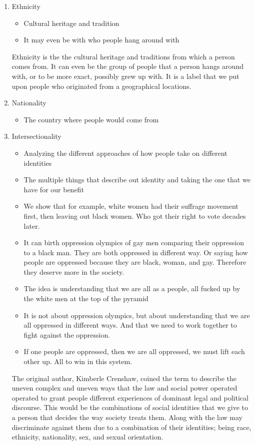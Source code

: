 \documentclass{article}
\begin{document}
\begin{enumerate}
  \item Ethnicity
    \begin{itemize}
      \item Cultural heritage and tradition
      \item It may even be with who people hang around with
    \end{itemize}
    Ethnicity is the the cultural heritage and traditions
    from which a person comes from.
    It can even be the group of people
    that a person hangs around with,
    or to be more exact, possibly
    grew up with. It is a label
    that we put upon people who
    originated from a geographical locations.
  \item Nationality
    \begin{itemize}
      \item The country where people would come from
    \end{itemize}
  \item Intersectionality
    \begin{itemize}
      \item Analyzing the different approaches
        of how people take on different identities
      \item The multiple things that describe
        out identity and taking the one that we have
        for our benefit
      \item We show that for example, white women had their
        suffrage movement first,
        then leaving out black women. Who
        got their right to vote decades later.
      \item It can birth oppression olympics of gay men comparing their 
        oppression to a black man. They are both oppressed in different
        way.
        Or saying how people are oppressed because they are
        black, woman, and gay. 
        Therefore they deserve more in the society.
      \item The idea is understanding that we are all as a people, all
        fucked up by the white men at the top of the 
        pyramid
      \item It is not about oppression olympics, but about
        understanding that we are all oppressed in different ways.
        And that we need to work together to fight against the 
        oppression.
      \item If one people are oppressed, then we are all oppressed,
        we must lift each other up.
        All to win in this system.
    \end{itemize}
    The original author, Kimberle Crenshaw, coined the term
    to describe the uneven complex and uneven ways that the law
    and social power operated operated to grant people
    different experiences of dominant legal and political discourse.
    This would be the combinations of social
    identities that we give to a person that decides
    the way society treats them. Along with the law
    may discriminate against them due to a combination
    of their identities; being race, ethnicity, nationality, sex, and sexual orientation.
\end{enumerate}
\end{document}
